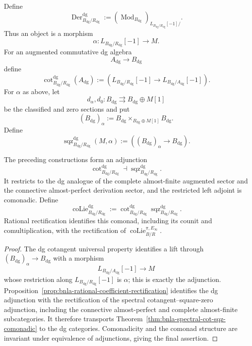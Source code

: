 \begin{definition}
\label{def:bnla-relative-dg-cot-sqz}
Define
\[
    \operatorname{Der}^{\mathrm{dg}}_{B_{\mathrm{dg}}/R_{\mathrm{dg}}}
    :=
    \left(
        \operatorname{Mod}_{B_{\mathrm{dg}}}
    \right)_{L_{B_{\mathrm{dg}}/R_{\mathrm{dg}}}[-1]/}.
\]
Thus an object is a morphism
\[
    \alpha:
    L_{B_{\mathrm{dg}}/R_{\mathrm{dg}}}[-1]
    \longrightarrow M.
\]
For an augmented commutative dg algebra
\[
    A_{\mathrm{dg}}\longrightarrow B_{\mathrm{dg}}
\]
define
\[
    \operatorname{cot}^{\mathrm{dg}}_{B_{\mathrm{dg}}/R_{\mathrm{dg}}}
    (A_{\mathrm{dg}})
    :=
    \left(
    L_{B_{\mathrm{dg}}/R_{\mathrm{dg}}}[-1]
    \longrightarrow
    L_{B_{\mathrm{dg}}/A_{\mathrm{dg}}}[-1]
    \right).
\]
For $\alpha$ as above, let
\[
    d_\alpha,d_0:
    B_{\mathrm{dg}}
    \rightrightarrows
    B_{\mathrm{dg}}\oplus M[1]
\]
be the classified and zero sections and put
\[
\boxed{
    (B_{\mathrm{dg}})_\alpha
    :=
    B_{\mathrm{dg}}
    \times_{B_{\mathrm{dg}}\oplus M[1]}
    B_{\mathrm{dg}}.}
\]
Define
\[
    \operatorname{sqz}^{\mathrm{dg}}_{B_{\mathrm{dg}}/R_{\mathrm{dg}}}
    (M,\alpha)
    :=
    \left((B_{\mathrm{dg}})_\alpha\to B_{\mathrm{dg}}\right).
\]
\end{definition}

\begin{proposition}
\label{prop:bnla-relative-dg-colie}
The preceding constructions form an adjunction
\[
    \operatorname{cot}^{\mathrm{dg}}_{B_{\mathrm{dg}}/R_{\mathrm{dg}}}
    \dashv
    \operatorname{sqz}^{\mathrm{dg}}_{B_{\mathrm{dg}}/R_{\mathrm{dg}}}.
\]
It restricts to the dg analogue of the complete almost-finite augmented sector
and the connective almost-perfect derivation sector, and the restricted left
adjoint is comonadic.  Define
\[
\boxed{
    \operatorname{coLie}^{\mathrm{dg}}_{B_{\mathrm{dg}}/R_{\mathrm{dg}}}
    :=
    \operatorname{cot}^{\mathrm{dg}}_{B_{\mathrm{dg}}/R_{\mathrm{dg}}}
    \operatorname{sqz}^{\mathrm{dg}}_{B_{\mathrm{dg}}/R_{\mathrm{dg}}}.}
\]
Rational rectification identifies this comonad, including its counit and
comultiplication, with the rectification of
$\operatorname{coLie}^{\pi,E_\infty}_{B/R}$.
\end{proposition}

\begin{proof}
The dg cotangent universal property identifies a lift through
$(B_{\mathrm{dg}})_\alpha\to B_{\mathrm{dg}}$ with a morphism
\[
    L_{B_{\mathrm{dg}}/A_{\mathrm{dg}}}[-1]
    \longrightarrow M
\]
whose restriction along
$L_{B_{\mathrm{dg}}/R_{\mathrm{dg}}}[-1]$ is $\alpha$; this is exactly the
adjunction.  Proposition~\ref{prop:bnla-rational-coefficient-rectification}
identifies the dg adjunction with the rectification of the spectral
cotangent--square-zero adjunction, including the connective almost-perfect and
complete almost-finite subcategories.  It therefore transports
Theorem~\ref{thm:bnla-spectral-cot-sqz-comonadic} to the dg categories.
Comonadicity and the comonad structure are invariant under equivalence of
adjunctions, giving the final assertion.
\end{proof}

